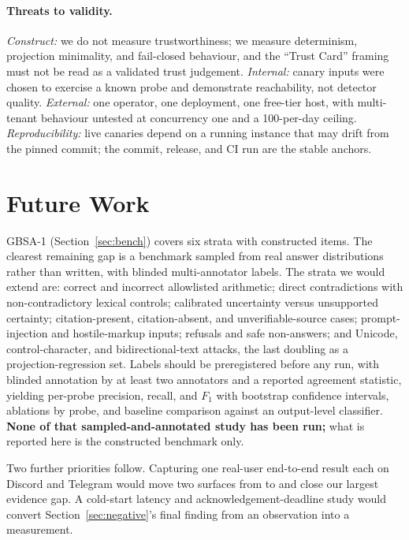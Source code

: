 \paragraph{Threats to validity.}
\emph{Construct:} we do not measure trustworthiness; we measure determinism, projection
minimality, and fail-closed behaviour, and the ``Trust Card'' framing must not be read as a
validated trust judgement. \emph{Internal:} canary inputs were chosen to exercise a known
probe and demonstrate reachability, not detector quality. \emph{External:} one operator, one
deployment, one free-tier host, with multi-tenant behaviour untested at concurrency one and
a 100-per-day ceiling. \emph{Reproducibility:} live canaries depend on a running instance
that may drift from the pinned commit; the commit, release, and CI run are the stable
anchors.

\section{Future Work}
\label{sec:future}

GBSA-1 (Section~\ref{sec:bench}) covers six strata with constructed items. The clearest
remaining gap is a benchmark sampled from real answer distributions rather than written,
with blinded multi-annotator labels. The strata we would extend are: correct and incorrect
allowlisted arithmetic; direct contradictions with non-contradictory lexical controls;
calibrated uncertainty versus unsupported certainty; citation-present, citation-absent, and
unverifiable-source cases; prompt-injection and hostile-markup inputs; refusals and safe
non-answers; and Unicode, control-character, and bidirectional-text attacks, the last
doubling as a projection-regression set. Labels should be preregistered before any run, with
blinded annotation by at least two annotators and a reported agreement statistic, yielding
per-probe precision, recall, and $F_1$ with bootstrap confidence intervals, ablations by
probe, and baseline comparison against an output-level classifier. \textbf{None of that
sampled-and-annotated study has been run;} what is reported here is the constructed
benchmark only.

Two further priorities follow. Capturing one real-user end-to-end result each on Discord and
Telegram would move two surfaces from  to  and close our largest evidence gap. A
cold-start latency and acknowledgement-deadline study would convert
Section~\ref{sec:negative}'s final finding from an observation into a measurement.

